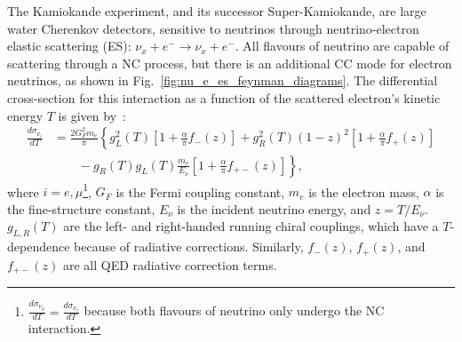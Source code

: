 
The Kamiokande experiment, and its successor Super-Kamiokande, are large water Cherenkov detectors, sensitive to neutrinos through neutrino-electron elastic scattering (ES): $\nu_{x} + e^{-}\to\nu_{x} + e^{-}$. All flavours of neutrino are capable of scattering through a NC process, but there is an additional CC mode for electron neutrinos, as shown in Fig.~\ref{fig:nu_e_es_feynman_diagrams}. The differential cross-section for this interaction as a function of the scattered electron's kinetic energy $T$ is given by~\cite{bahcallSolarNeutrinosRadiative1995}: %
\begin{align}\label{eq:enu_es_xsec}
    \frac{d\sigma_{\nu_{i}}}{dT} &= \frac{2G_{F}^{2}m_{e}}{\pi}\left\{
        g_{L}^{2}(T)\left[
            1 + \frac{\alpha}{\pi}f_{-}(z)
        \right]
        + g_{R}^{2}(T)(1-z)^{2}\left[
            1 + \frac{\alpha}{\pi}f_{+}(z)
        \right]\right.\nonumber\\
        &\qquad \left. {}
        -g_{R}(T)g_{L}(T)\frac{m_{e}}{E_{\nu}}\left[
            1 + \frac{\alpha}{\pi}f_{+-}(z)
        \right]
    \right\},
\end{align}
where $i = e, \mu$\footnote{
    $\frac{d\sigma_{\nu_{\mu}}}{dT} = \frac{d\sigma_{\nu_{\tau}}}{dT}$ because both flavours of neutrino only undergo the NC interaction.
}, $G_{F}$ is the Fermi coupling constant, $m_{e}$ is the electron mass, $\alpha$ is the fine-structure constant, $E_{\nu}$ is the incident neutrino energy, and $z = T/E_{\nu}$. $g_{L,R}(T)$ are the left- and right-handed running chiral couplings, which have a $T$-dependence because of radiative corrections. Similarly, $f_{-}(z)$, $f_{+}(z)$, and $f_{+-}(z)$ are all QED radiative correction terms. 

